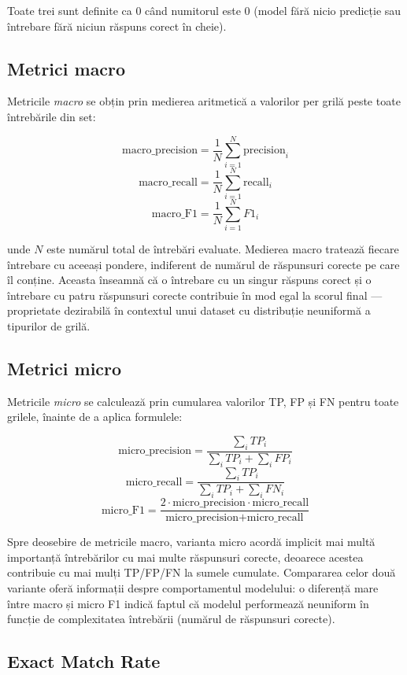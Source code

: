 \documentclass[12pt, a4paper, oneside, romanian]{teza-upb}
\begin{document}
Toate trei sunt definite ca $0$ când numitorul este $0$ (model fără nicio predicție sau întrebare fără niciun răspuns corect în cheie).

\subsection{Metrici macro}

Metricile \textit{macro} se obțin prin medierea aritmetică a valorilor per grilă peste toate întrebările din set:

\[ \text{macro\_precision} = \frac{1}{N} \sum_{i=1}^{N} \text{precision}_i \]
\[ \text{macro\_recall} = \frac{1}{N} \sum_{i=1}^{N} \text{recall}_i \]
\[ \text{macro\_F1} = \frac{1}{N} \sum_{i=1}^{N} F1_i \]

unde $N$ este numărul total de întrebări evaluate. Medierea macro tratează fiecare întrebare cu aceeași pondere, indiferent de numărul de răspunsuri corecte pe care îl conține. Aceasta înseamnă că o întrebare cu un singur răspuns corect și o întrebare cu patru răspunsuri corecte contribuie în mod egal la scorul final --- proprietate dezirabilă în contextul unui dataset cu distribuție neuniformă a tipurilor de grilă.

\subsection{Metrici micro}

Metricile \textit{micro} se calculează prin cumularea valorilor TP, FP și FN pentru toate grilele, înainte de a aplica formulele:

\[ \text{micro\_precision} = \frac{\sum_{i} TP_i}{\sum_{i} TP_i + \sum_{i} FP_i} \]
\[ \text{micro\_recall} = \frac{\sum_{i} TP_i}{\sum_{i} TP_i + \sum_{i} FN_i} \]
\[ \text{micro\_F1} = \frac{2 \cdot \text{micro\_precision} \cdot \text{micro\_recall}}{\text{micro\_precision} + \text{micro\_recall}} \]

Spre deosebire de metricile macro, varianta micro acordă implicit mai multă importanță întrebărilor cu mai multe răspunsuri corecte, deoarece acestea contribuie cu mai mulți TP/FP/FN la sumele cumulate. Compararea celor două variante oferă informații despre comportamentul modelului: o diferență mare între macro și micro F1 indică faptul că modelul performează neuniform în funcție de complexitatea întrebării (numărul de răspunsuri corecte).

\subsection{Exact Match Rate}
\end{document}
